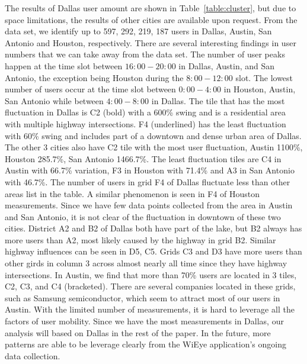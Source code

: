 %
%
%
%




The results of Dallas user amount are shown in Table~\ref{table:cluster}, but due to space limitations, the results of other cities are available upon request.
From the data set, we identify up to 597, 292, 219, 187 users in Dallas, Austin, San Antonio and Houston, respectively.
There are several interesting findings in user numbers that we can take away from the data set.
The number of user peaks happen at the time slot between $16:00-20:00$ in Dallas, Austin, and San Antonio, the exception being Houston during the $8:00-12:00$ slot.
The lowest number of users occur at the time slot between $0:00-4:00$ in Houston, Austin, San Antonio while between $4:00-8:00$ in Dallas.
The tile that has the most fluctuation in Dallas is C2 (bold) with a 600\% swing and is a residential area with multiple highway intersections.
F4 (underlined) has the least fluctuation with 60\% swing and includes part of a downtown and dense urban area of Dallas. 
The other 3 cities also have C2 tile with the most user fluctuation, Austin 1100\%, Houston 285.7\%, San Antonio 1466.7\%. 
The least fluctuation tiles are C4 in Austin with 66.7\% variation, F3 in Houston with 71.4\% and A3 in San Antonio with 46.7\%. 
The number of users in grid F4 of Dallas fluctuate less than other areas list in the table.
A similar phenomenon is seen in F4 of Houston measurements. 
Since we have few data points collected from the area in Austin and San Antonio, it is not clear of the fluctuation in downtown of these two cities.
District A2 and B2 of Dallas both have part of the lake, but B2 always has more users than A2, most likely caused by the highway in grid B2. 
Similar highway influences can be seen in D5, C5. 
Grids C3 and D3 have more users than other girds in column 3 across almost nearly all time since they have highway intersections.
In Austin, we find that more than 70\% users are located in 3 tiles, C2, C3, and C4 (bracketed). 
There are several companies located in these grids, such as Samsung semiconductor, which seem to attract most of our users in Austin.
With the limited number of measurements, it is hard to leverage all the factors of user mobility. 
Since we have the most measurements in Dallas, our analysis will based on Dallas in the rest of the paper.
In the future, more patterns are able to be leverage clearly from the WiEye application's ongoing data collection.


